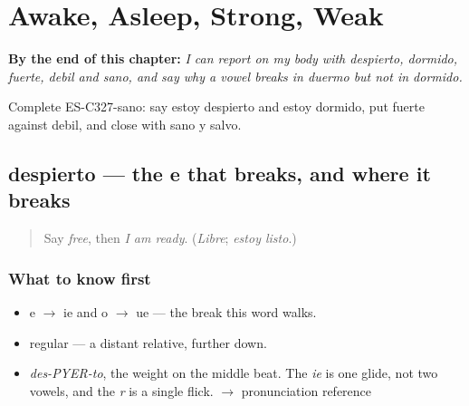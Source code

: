 
\chapter{Awake, Asleep, Strong, Weak}
\label{ch:despierto-y-sano}

\begin{chapteropening}
\textbf{By the end of this chapter:} \emph{I can report on my body with despierto, dormido, fuerte, debil and sano, and say why a vowel breaks in duermo but not in dormido.}

Complete ES-C327-sano: say estoy despierto and estoy dormido, put fuerte against debil, and close with sano y salvo.
\end{chapteropening}

\section[despierto]{despierto — the e that breaks, and where it breaks}

\label{lesson:ES-C327-despierto}



\begin{quote}
Say \emph{free}, then \emph{I am ready}. (\emph{Libre}; \emph{estoy listo}.)
\end{quote}

\subsection*{What to know first}
\begin{itemize}
\raggedright
  \item e $\to$ ie and o $\to$ ue — the break this word walks.
  \item regular — a distant relative, further down.
\end{itemize}

\begin{sounds}
\begin{itemize}
\raggedright
  \item \emph{des-PYER-to}, the weight on the middle beat. The \emph{ie} is one glide, not two vowels, and the \emph{r} is a single flick. $\to$ pronunciation reference
\end{itemize}
\end{sounds}

